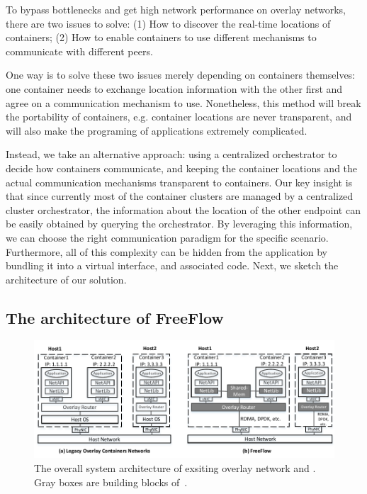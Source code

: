To bypass bottlenecks and get high network performance on overlay
networks, there are two issues to solve: (1) How to discover the real-time locations of containers; (2) How to enable containers
to use different mechanisms to communicate with different peers.

One way is to solve these two issues merely depending on containers themselves:
one container needs to exchange location information with the other first and
agree on a communication mechanism to use. Nonetheless, this method will 
break the portability of containers, e.g. container locations are never transparent, and will also make the programing of applications extremely 
complicated. 

Instead, we take an alternative approach: using a centralized orchestrator to decide how containers communicate, and keeping the container locations and the actual
communication mechanisms transparent to containers.
Our key insight is that since currently most of the container clusters are managed by a centralized cluster orchestrator, the information about the location of the other endpoint
can be easily obtained by querying the orchestrator. By leveraging this
information, we can choose the right communication paradigm for the specific
scenario. Furthermore, all of this complexity can be hidden from the application
by bundling it into a virtual interface, and associated code. Next, we sketch the architecture of our solution.

\subsection{The architecture of FreeFlow}

\begin{figure}[t!] 
     \centering 
     \includegraphics[width=7in]{figures/system-arch.pdf} 
    \caption{\label{fig:sysarch} The overall system architecture of exsiting overlay network and \sysname. Gray boxes are building blocks of~\sysname.} 
\end{figure} 